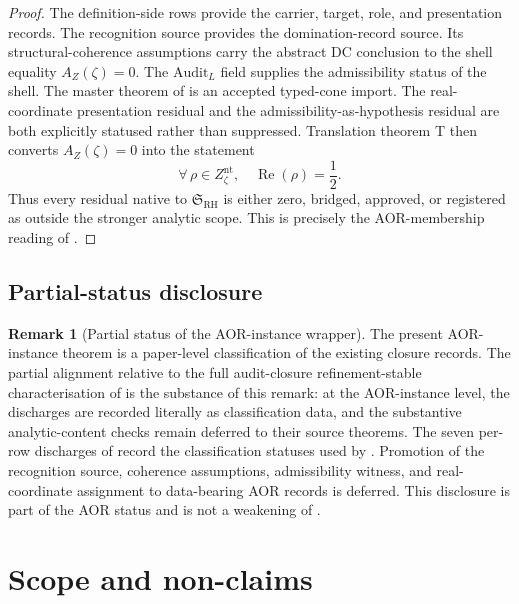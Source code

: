 \documentclass[11pt]{article}
\DeclareMathOperator{\Real}{Re}
\newcommand{\Znt}{Z_{\zeta}^{\mathrm{nt}}}
\newcommand{\AZ}{A_{Z}(\zeta)}
\theoremstyle{definition}
\newtheorem{remark}[theorem]{Remark}
\begin{document}
\begin{proof}
The definition-side rows provide the carrier, target, role, and
presentation records.  The recognition source provides the
domination-record source.  Its structural-coherence assumptions carry
the abstract DC conclusion to the shell equality \(\AZ=0\).  The
\(\mathrm{Audit}_{L}\) field supplies the admissibility
status of the shell.  The master theorem of \citet{TsiokosSDTC2026}
is an accepted typed-cone import.  The real-coordinate presentation
residual and the admissibility-as-hypothesis residual are both
explicitly statused rather than suppressed.  Translation theorem T
then converts \(\AZ=0\) into the statement
\[
  \forall\,\rho\in\Znt,\quad \Real(\rho)=\frac12.
\]
Thus every residual native to \(\mathfrak S_{\mathrm{RH}}\) is either
zero, bridged, approved, or registered as outside the stronger
analytic scope.  This is precisely the AOR-membership reading of
.
\end{proof}

\subsection{Partial-status disclosure}

\begin{remark}[Partial status of the AOR-instance wrapper]
\label{rem:rh:aor-partial-status}
The present AOR-instance theorem is a paper-level classification of
the existing closure records.  The partial alignment relative to the
full audit-closure refinement-stable characterisation of
\citet{TsiokosAOR2026} is the substance of this remark: at the
AOR-instance level, the discharges are recorded literally as
classification data, and the substantive analytic-content checks
remain deferred to their source theorems.  The seven per-row
discharges of
 record the classification
statuses used by .  Promotion of the
recognition source, coherence assumptions, admissibility witness, and
real-coordinate assignment to data-bearing AOR records is deferred.
This disclosure is part of the AOR status and is not a weakening of
.
\end{remark}
 

\section{Scope and non-claims}
\label{sec:scope_and_nonclaims}
\end{document}
